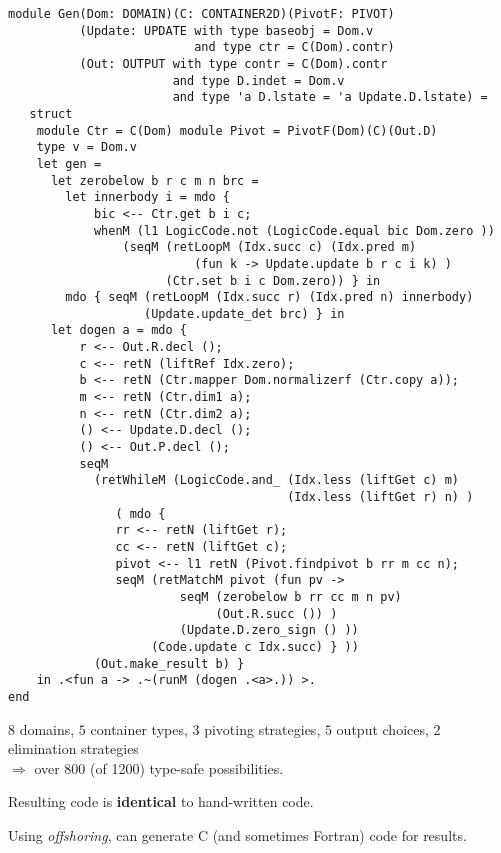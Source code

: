 \documentclass[landscape]{slides}
\begin{document}
\begin{slide}
    \begin{small}
\begin{verbatim}
module Gen(Dom: DOMAIN)(C: CONTAINER2D)(PivotF: PIVOT)
          (Update: UPDATE with type baseobj = Dom.v 
                          and type ctr = C(Dom).contr)
          (Out: OUTPUT with type contr = C(Dom).contr 
                       and type D.indet = Dom.v 
                       and type 'a D.lstate = 'a Update.D.lstate) =
   struct
    module Ctr = C(Dom) module Pivot = PivotF(Dom)(C)(Out.D)
    type v = Dom.v
    let gen =
      let zerobelow b r c m n brc =
        let innerbody i = mdo {
            bic <-- Ctr.get b i c;
            whenM (l1 LogicCode.not (LogicCode.equal bic Dom.zero ))
                (seqM (retLoopM (Idx.succ c) (Idx.pred m)
                          (fun k -> Update.update b r c i k) )
                      (Ctr.set b i c Dom.zero)) } in 
        mdo { seqM (retLoopM (Idx.succ r) (Idx.pred n) innerbody) 
                   (Update.update_det brc) } in
      let dogen a = mdo {
          r <-- Out.R.decl ();
          c <-- retN (liftRef Idx.zero);
          b <-- retN (Ctr.mapper Dom.normalizerf (Ctr.copy a));
          m <-- retN (Ctr.dim1 a);
          n <-- retN (Ctr.dim2 a);
          () <-- Update.D.decl ();
          () <-- Out.P.decl ();
          seqM 
            (retWhileM (LogicCode.and_ (Idx.less (liftGet c) m)
                                       (Idx.less (liftGet r) n) )
               ( mdo {
               rr <-- retN (liftGet r);
               cc <-- retN (liftGet c);
               pivot <-- l1 retN (Pivot.findpivot b rr m cc n);
               seqM (retMatchM pivot (fun pv -> 
                        seqM (zerobelow b rr cc m n pv)
                             (Out.R.succ ()) )
                        (Update.D.zero_sign () ))
                    (Code.update c Idx.succ) } ))
            (Out.make_result b) } 
    in .<fun a -> .~(runM (dogen .<a>.)) >.
end
\end{verbatim}
\end{small}
\end{slide}

\begin{slide}
$8$ domains, $5$ container types, $3$ pivoting strategies, 
$5$ output choices, $2$ elimination strategies\\
$\Longrightarrow$ over 800 (of 1200) type-safe possibilities.

Resulting code is \textbf{identical} to hand-written code.

Using \emph{offshoring}, can generate C (and sometimes Fortran) code
for results.
\end{slide}
\end{document}
